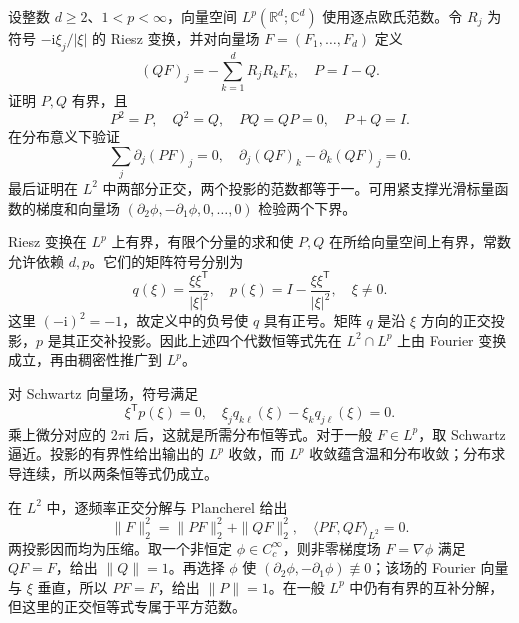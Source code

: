 \begin{exercise}\label{b2:ex:22-new-6}
设整数 \(d\geq2\)、\(1<p<\infty\)，向量空间 \(L^p(\mathbb R^d;\mathbb C^d)\) 使用逐点欧氏范数。令 \(R_j\) 为符号 \(-\mathrm i\xi_j/|\xi|\) 的 Riesz 变换，并对向量场 \(F=(F_1,\ldots,F_d)\) 定义
\[
 (QF)_j=-\sum_{k=1}^dR_jR_kF_k,
 \quad P=I-Q.
\]
证明 \(P,Q\) 有界，且
\[
 P^2=P,\quad Q^2=Q,\quad PQ=QP=0,\quad P+Q=I.
\]
在分布意义下验证
\[
 \sum_j\partial_j(PF)_j=0,
 \quad
 \partial_j(QF)_k-\partial_k(QF)_j=0.
\]
最后证明在 \(L^2\) 中两部分正交，两个投影的范数都等于一。可用紧支撑光滑标量函数的梯度和向量场 \((\partial_2\phi,-\partial_1\phi,0,\ldots,0)\) 检验两个下界。
\end{exercise}
\begin{solution}
Riesz 变换在 \(L^p\) 上有界，有限个分量的求和使 \(P,Q\) 在所给向量空间上有界，常数允许依赖 \(d,p\)。它们的矩阵符号分别为
\[
 q(\xi)=\frac{\xi\xi^{\mathsf T}}{|\xi|^2},
 \quad p(\xi)=I-\frac{\xi\xi^{\mathsf T}}{|\xi|^2},
 \quad\xi\ne0.
\]
这里 \((-\mathrm i)^2=-1\)，故定义中的负号使 \(q\) 具有正号。矩阵 \(q\) 是沿 \(\xi\) 方向的正交投影，\(p\) 是其正交补投影。因此上述四个代数恒等式先在 \(L^2\cap L^p\) 上由 Fourier 变换成立，再由稠密性推广到 \(L^p\)。

对 Schwartz 向量场，符号满足
\[
 \xi^{\mathsf T}p(\xi)=0,
 \quad \xi_jq_{k\ell}(\xi)-\xi_kq_{j\ell}(\xi)=0.
\]
乘上微分对应的 \(2\pi\mathrm i\) 后，这就是所需分布恒等式。对于一般 \(F\in L^p\)，取 Schwartz 逼近。投影的有界性给出输出的 \(L^p\) 收敛，而 \(L^p\) 收敛蕴含温和分布收敛；分布求导连续，所以两条恒等式仍成立。

在 \(L^2\) 中，逐频率正交分解与 Plancherel 给出
\[
 \|F\|_2^2=\|PF\|_2^2+\|QF\|_2^2,
 \quad\langle PF,QF\rangle_{L^2}=0.
\]
两投影因而均为压缩。取一个非恒定 \(\phi\in C_c^\infty\)，则非零梯度场 \(F=\nabla\phi\) 满足 \(QF=F\)，给出 \(\|Q\|=1\)。再选择 \(\phi\) 使 \((\partial_2\phi,-\partial_1\phi)\not\equiv0\)；该场的 Fourier 向量与 \(\xi\) 垂直，所以 \(PF=F\)，给出 \(\|P\|=1\)。在一般 \(L^p\) 中仍有有界的互补分解，但这里的正交恒等式专属于平方范数。
\end{solution}

